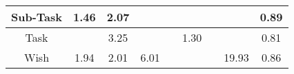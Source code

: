 \begin{tabular}{|c||c|c|c|c|c|c|c|c|}
\hline
Sub-Task & \cellcolor[rgb]{0.9007262298082216,0.8356071614881049,0.42} 1.46 & \cellcolor[rgb]{0.8884725228836731,0.8298027739975294,0.42} 2.07 &  &  &  &  &  & \cellcolor[rgb]{0.8939086642008989,0.7638343438842544,0.40498141992083886} 0.89 \\ 
\hline
Task &  & \cellcolor[rgb]{0.8648518690217937,0.8186140432208496,0.42} 3.25 &  &  & \cellcolor[rgb]{0.9040569492905177,0.837184870716561,0.42} 1.30 &  &  & \cellcolor[rgb]{0.8816181467027367,0.705659227726287,0.3935102702558876} 0.81 \\ 
\hline
Wish & \cellcolor[rgb]{0.8912035870124831,0.8310964359532814,0.42} 1.94 & \cellcolor[rgb]{0.8896901841009773,0.8303795608899366,0.42} 2.01 & \cellcolor[rgb]{0.8093636326832182,0.7923301417973139,0.42} 6.01 &  &  &  & \cellcolor[rgb]{0.53,0.66,0.42} 19.93 & \cellcolor[rgb]{0.8879163794704613,0.7354708628268501,0.3993886208390972} 0.86 \\ 
\hline
\end{tabular}